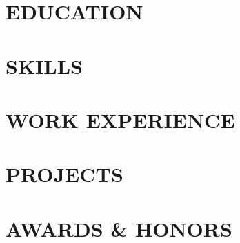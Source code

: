 \documentclass[11pt,letterpaper]{article}
\newcommand{\xspace}{0.25\baselineskip}
\begin{document}


\section*{EDUCATION}
    

\section*{SKILLS}

\section*{WORK EXPERIENCE}
    

\section*{PROJECTS}
    
    \vspace{\xspace} %
    
    \vspace{\xspace}
    
    \vspace{\xspace} %
    

\section{AWARDS \& HONORS}
    

\end{document}
